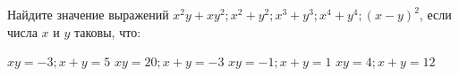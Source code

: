 \begin{consultation}
	\begin{listofex}
		\item Найдите значение выражений \(x^2y+xy^2; x^2 + y^2; x^3 + y^3; x^4 + y^4; (x-y)^2\), если числа \(x\) и \(y\) таковы, что:
		\begin{itasks}[2]
			\task \(xy=-3; x+y=5\)
			\task \(xy=20; x+y=-3\)
			\task \(xy=-1; x+y=1\)
			\task \(xy=4; x+y=12\)
		\end{itasks}

%

		

\end{listofex}
\end{consultation}
